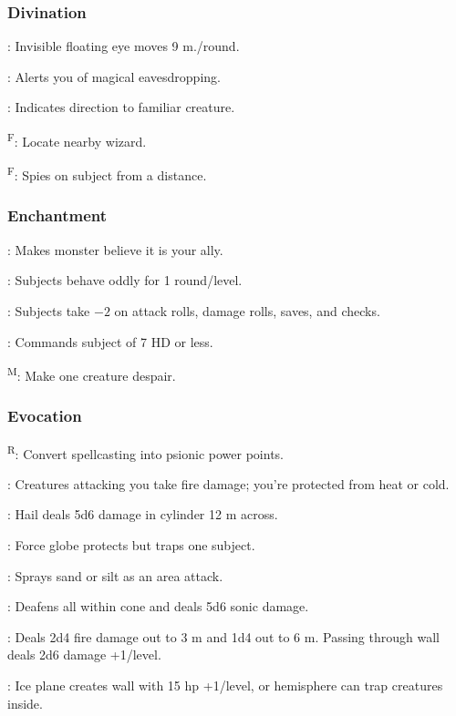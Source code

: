 \subsubsection{Divination}
	: Invisible floating eye moves 9 m./round.

	: Alerts you of magical eavesdropping.

	: Indicates direction to familiar creature.

	\textsuperscript{F}: Locate nearby wizard. %

	\textsuperscript{F}: Spies on subject from a distance.

\subsubsection{Enchantment}
	: Makes monster believe it is your ally.

	: Subjects behave oddly for 1 round/level.

	: Subjects take $-2$ on attack rolls, damage rolls, saves, and checks.

	: Commands subject of 7 HD or less.

	\textsuperscript{M}: Make one creature despair.

\subsubsection{Evocation}
	\textsuperscript{R}: Convert spellcasting into psionic power points.

	: Creatures attacking you take fire damage; you're protected from heat or cold.

	: Hail deals 5d6 damage in cylinder 12 m across.

	: Force globe protects but traps one subject.

	: Sprays sand or silt as an area attack. %

	: Deafens all within cone and deals 5d6 sonic damage.

	: Deals 2d4 fire damage out to 3 m and 1d4 out to 6 m. Passing through wall deals 2d6 damage +1/level.

	: Ice plane creates wall with 15 hp +1/level, or hemisphere can trap creatures inside.

